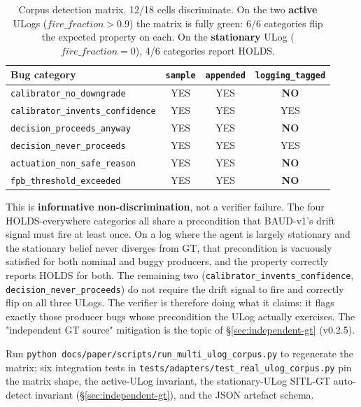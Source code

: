 \documentclass[acmsmall,nonacm=true,review=false]{acmart}
\theoremstyle{plain}
\begin{document}
\begin{table}[h]
\centering\small
\begin{tabular}{l c c c}
\toprule
\textbf{Bug category} & \texttt{sample} & \texttt{appended} & \texttt{logging\_tagged} \\
\midrule
\texttt{calibrator\_no\_downgrade}        & YES & YES & \textbf{NO}  \\
\texttt{calibrator\_invents\_confidence}  & YES & YES & YES \\
\texttt{decision\_proceeds\_anyway}       & YES & YES & \textbf{NO}  \\
\texttt{decision\_never\_proceeds}        & YES & YES & YES \\
\texttt{actuation\_non\_safe\_reason}     & YES & YES & \textbf{NO}  \\
\texttt{fpb\_threshold\_exceeded}         & YES & YES & \textbf{NO}  \\
\bottomrule
\end{tabular}
\caption{Corpus detection matrix. 12/18 cells discriminate.
On the two \textbf{active} ULogs ($\mathit{fire\_fraction} > 0.9$)
the matrix is fully green: 6/6 categories flip the expected
property on each. On the \textbf{stationary} ULog
($\mathit{fire\_fraction} = 0$), 4/6 categories report HOLDS.}
\label{tab:multi-ulog-corpus}
\end{table}

This is \textbf{informative non-discrimination}, not a verifier
failure. The four HOLDS-everywhere categories all share a
precondition that BAUD-v1's drift signal must fire at least
once. On a log where the agent is largely stationary and the
stationary belief never diverges from GT, that precondition is
vacuously satisfied for both nominal and buggy producers, and
the property correctly reports HOLDS for both. The remaining
two (\texttt{calibrator\_invents\_confidence},
\texttt{decision\_never\_proceeds}) do not require the drift
signal to fire and correctly flip on all three ULogs. The
verifier is therefore doing what it claims: it flags exactly
those producer bugs whose precondition the ULog actually
exercises. The "independent GT source" mitigation is the topic
of \S\ref{sec:independent-gt} (v0.2.5).

Run \texttt{python docs/paper/scripts/run\_multi\_ulog\_corpus.py}
to regenerate the matrix; six integration tests in
\texttt{tests/adapters/test\_real\_ulog\_corpus.py} pin the
matrix shape, the active-ULog invariant, the stationary-ULog
SITL-GT auto-detect invariant (\S\ref{sec:independent-gt}),
and the JSON artefact schema.
\end{document}
